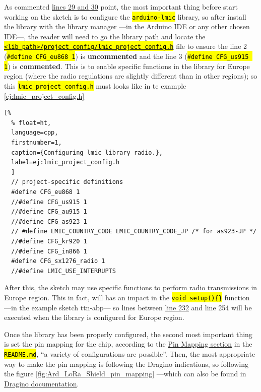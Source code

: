 \documentclass[11pt,a4paper,dvipsnames,twoside]{article}
\newcommand{\cmd}[1] {\hl{\texttt{#1}}}
\begin{document}
As commented \href{https://github.com/mcci-catena/arduino-lmic/blob/master/examples/ttn-abp/ttn-abp.ino#L29}{lines 29 and 30} point, the most important thing before start working on the sketch is to configure the \cmd{arduino-lmic} library, so after install the library with the library manager ---in the Arduino IDE or any other chosen IDE---, the reader will need to go the library path and locate the \href{https://github.com/mcci-catena/arduino-lmic/blob/master/project_config/lmic_project_config.h}{\cmd{<lib\_path>/project\_config/lmic\_project\_config.h}} file to ensure the line 2 (\cmd{\#define CFG\_eu868 1}) is \textbf{uncommented} and the line 3 (\cmd{\#define CFG\_us915 1}) is \textbf{commented}. This is to enable specific functions in the library for Europe region (where the radio regulations are slightly different than in other regions); so this \cmd{lmic\_project\_config.h} must looks like in te example \ref{ej:lmic_project_config.h}

\begin{lstlisting}[%
  % float=ht,
  language=cpp,
  firstnumber=1,
  caption={Configuring lmic library radio.},
  label=ej:lmic_project_config.h
  ]
  // project-specific definitions
  #define CFG_eu868 1
  //#define CFG_us915 1
  //#define CFG_au915 1
  //#define CFG_as923 1
  // #define LMIC_COUNTRY_CODE LMIC_COUNTRY_CODE_JP	/* for as923-JP */
  //#define CFG_kr920 1
  //#define CFG_in866 1
  #define CFG_sx1276_radio 1
  //#define LMIC_USE_INTERRUPTS
\end{lstlisting}

After this, the sketch may use specific functions to perform radio transmissions in Europe region. This in fact, will has an impact in the \cmd{void setup()\{\}} function ---in the example sketch ttn-abp--- so lines between \href{https://github.com/mcci-catena/arduino-lmic/blob/master/examples/ttn-abp/ttn-abp.ino#L232}{line 232} and line 254 will be executed when the library is configured for Europe region.

Once the library has been properly configured, the second most important thing is set the pin mapping for the chip, according to the \href{https://github.com/mcci-catena/arduino-lmic#pin-mapping}{Pin Mapping section} in the \cmd{README.md}, \enquote{a variety of configurations are possible}. Then, the most appropriate way to make the pin mapping is following the Dragino indications, so following the figure \ref{fig:Ard_LoRa_Shield_pin_mapping} ---which can also be found in \href{http://wiki.dragino.com/index.php?title=Lora_Shield#Pin_Mapping_and_Unused_Pins}{Dragino documentation}.
\end{document}
